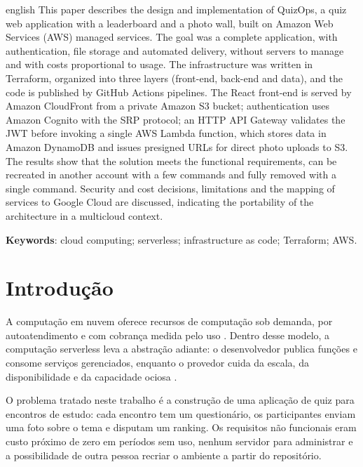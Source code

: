 \documentclass[article, 12pt, oneside, a4paper, english, brazil, sumario=tradicional]{abntex2}
\begin{document}
\renewcommand{\resumoname}{Abstract}
\begin{resumoumacoluna}
\begin{otherlanguage*}{english}
This paper describes the design and implementation of QuizOps, a quiz web application with a leaderboard and a photo wall, built on Amazon Web Services (AWS) managed services. The goal was a complete application, with authentication, file storage and automated delivery, without servers to manage and with costs proportional to usage. The infrastructure was written in Terraform, organized into three layers (front-end, back-end and data), and the code is published by GitHub Actions pipelines. The React front-end is served by Amazon CloudFront from a private Amazon S3 bucket; authentication uses Amazon Cognito with the SRP protocol; an HTTP API Gateway validates the JWT before invoking a single AWS Lambda function, which stores data in Amazon DynamoDB and issues presigned URLs for direct photo uploads to S3. The results show that the solution meets the functional requirements, can be recreated in another account with a few commands and fully removed with a single command. Security and cost decisions, limitations and the mapping of services to Google Cloud are discussed, indicating the portability of the architecture in a multicloud context.

\textbf{Keywords}: cloud computing; serverless; infrastructure as code; Terraform; AWS.
\end{otherlanguage*}
\end{resumoumacoluna}

\textual

\section{Introdução}

A computação em nuvem oferece recursos de computação sob demanda, por autoatendimento e com cobrança medida pelo uso \cite{mell2011}. Dentro desse modelo, a computação serverless leva a abstração adiante: o desenvolvedor publica funções e consome serviços gerenciados, enquanto o provedor cuida da escala, da disponibilidade e da capacidade ociosa \cite{baldini2017,jonas2019}.

O problema tratado neste trabalho é a construção de uma aplicação de quiz para encontros de estudo: cada encontro tem um questionário, os participantes enviam uma foto sobre o tema e disputam um ranking. Os requisitos não funcionais eram custo próximo de zero em períodos sem uso, nenhum servidor para administrar e a possibilidade de outra pessoa recriar o ambiente a partir do repositório.
\end{document}
